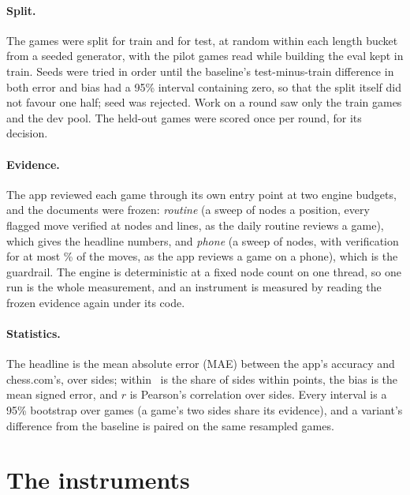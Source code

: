 \documentclass[11pt]{article}
\begin{document}
\paragraph{Split.} The \Games{} games were split \GamesTrain{} for train and \GamesTest{} for
test, at random within each length bucket from a seeded generator, with the pilot games read
while building the eval kept in train. Seeds were tried in order until the baseline's
test-minus-train difference in both error and bias had a 95\% interval containing zero, so that
the split itself did not favour one half; \RejectedSplits{} seed was rejected. Work on a round saw
only the train games and the dev pool. The held-out games were scored once per round, for its
decision.

\paragraph{Evidence.} The app reviewed each game through its own entry point at two engine
budgets, and the documents were frozen: \emph{routine} (a sweep of \RoutineScan{} nodes a
position, every flagged move verified at \VerifyNodes{} nodes and \VerifyLines{} lines, as the
daily routine reviews a game), which gives the headline numbers, and \emph{phone} (a sweep of
\PhoneScan{} nodes, with verification for at most \PhoneShare\% of the moves, as the app reviews a
game on a phone), which is the guardrail. The engine is deterministic at a fixed node
count on one thread, so one run is the whole measurement, and an instrument is measured by
reading the frozen evidence again under its code.

\paragraph{Statistics.} The headline is the mean absolute error (MAE) between the app's
accuracy and chess.com's, over sides; within~\WithinPoints{} is the share of sides within \WithinPoints{}
points, the
bias is the mean signed error, and $r$ is Pearson's correlation over sides. Every interval is a
95\% bootstrap over games (a game's two sides share its evidence), and a variant's difference
from the baseline is paired on the same resampled games.

\section{The instruments}
\end{document}
